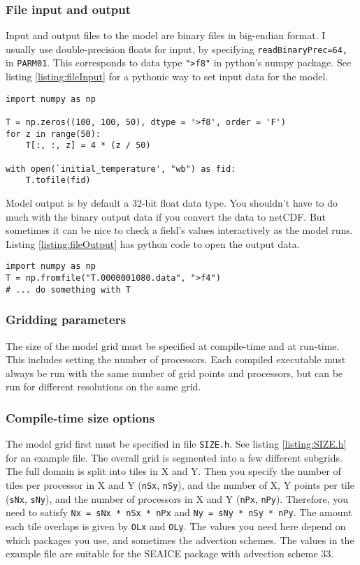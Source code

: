 \documentclass[11pt]{article}
\begin{document}
\subsubsection{File input and output}
Input and output files to the model are binary files in big-endian format. I usually use double-precision floats for input, by specifying \verb|readBinaryPrec=64,| in \verb|PARM01|. This corresponds to data type \verb|">f8"| in python's numpy package. See listing \ref{listing:fileInput} for a pythonic way to set input data for the model.

\begin{lstlisting}[caption={Python code for making input files to MITgcm}, label=listing:fileInput]
import numpy as np

T = np.zeros((100, 100, 50), dtype = '>f8', order = 'F')
for z in range(50):
	T[:, :, z] = 4 * (z / 50)

with open(`initial_temperature', "wb") as fid:
	T.tofile(fid)
\end{lstlisting}

Model output is by default a 32-bit float data type. You shouldn't have to do much with the binary output data if you convert the data to netCDF. But sometimes it can be nice to check a field's values interactively as the model runs. Listing \ref{listing:fileOutput} has python code to open the output data.

\begin{lstlisting}[caption={Python code for opening MITgcm binary output files}, label=listing:fileOutput]
import numpy as np
T = np.fromfile("T.0000001080.data", ">f4")
# ... do something with T
\end{lstlisting}

\subsubsection{Gridding parameters}
The size of the model grid must be specified at compile-time and at run-time. This includes setting the number of processors. Each compiled executable must always be run with the same number of grid points and processors, but can be run for different resolutions on the same grid.

\subsubsection*{Compile-time size options}
The model grid first must be specified in file \verb|SIZE.h|. See listing \ref{listing:SIZE.h} for an example file. The overall grid is segmented into a few different subgrids. The full domain is split into tiles in X and Y. Then you specify the number of tiles per processor in X and Y (\verb|nSx|, \verb|nSy|), and the number of X, Y points per tile (\verb|sNx|, \verb|sNy|), and the number of processors in X and Y (\verb|nPx|, \verb|nPy|). Therefore, you need to satisfy \verb|Nx = sNx * nSx * nPx| and \verb|Ny = sNy * nSy * nPy|. The amount each tile overlaps is given by \verb|OLx| and \verb|OLy|. The values you need here depend on which packages you use, and sometimes the advection schemes. The values in the example file are suitable for the SEAICE package with advection scheme 33.
\end{document}
